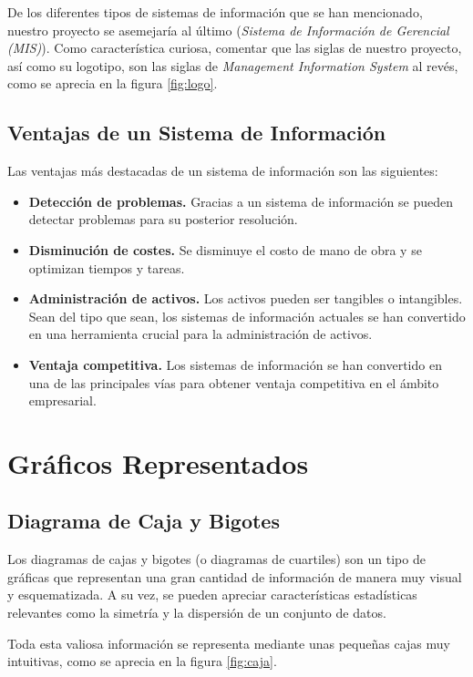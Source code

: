 De los diferentes tipos de sistemas de información que se han mencionado, nuestro proyecto se asemejaría al último (\emph{Sistema de Información de Gerencial (MIS)}). Como característica curiosa, comentar que las siglas de nuestro proyecto, así como su logotipo, son las siglas de \emph{Management Information System} al revés, como se aprecia en la figura \ref{fig:logo}.

 
\subsection{Ventajas de un Sistema de Información}

Las ventajas más destacadas de un sistema de información son las siguientes:

\begin{itemize}
\item \textbf{Detección de problemas.} Gracias a un sistema de información se pueden detectar problemas para su posterior resolución.
\item \textbf{Disminución de costes.} Se disminuye el costo de mano de obra y se optimizan tiempos y tareas\cite{ventajas}. 
\item \textbf{Administración de activos.} Los activos pueden ser tangibles o intangibles. Sean del tipo que sean, los sistemas de información actuales se han convertido en una herramienta crucial para la administración de activos.
\item \textbf{Ventaja competitiva.} Los sistemas de información se han convertido en una de las principales vías para obtener ventaja competitiva en el ámbito empresarial.
\end{itemize}


\section{Gráficos Representados}

\subsection{Diagrama de Caja y Bigotes}
Los diagramas de cajas y bigotes (o diagramas de cuartiles) son un tipo de gráficas que representan una gran cantidad de información de manera muy visual y esquematizada. A su vez, se pueden apreciar características estadísticas relevantes como la simetría y la dispersión de un conjunto de datos.

Toda esta valiosa información se representa mediante unas pequeñas cajas muy intuitivas, como se aprecia en la figura \ref{fig:caja}.

